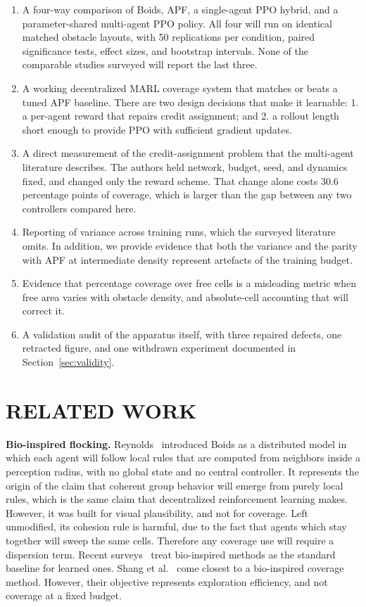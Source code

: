 \documentclass[a4paper, 10pt, conference]{ieeeconf}
\begin{document}
\begin{enumerate}
    \item A four-way comparison of Boids, APF, a single-agent PPO
    hybrid, and a parameter-shared multi-agent PPO policy. All four
    will run on identical matched obstacle layouts, with 50
    replications per condition, paired significance tests, effect
    sizes, and bootstrap intervals. None of the comparable studies
    surveyed will report the last three.
    \item A working decentralized MARL coverage system that matches or
    beats a tuned APF baseline. There are two design decisions that
    make it learnable: 1. a per-agent reward that repairs credit
    assignment; and 2. a rollout length short enough to provide PPO
    with sufficient gradient updates.
    \item A direct measurement of the credit-assignment problem that
    the multi-agent literature describes. The authors held network,
    budget, seed, and dynamics fixed, and changed only the reward
    scheme. That change alone costs 30.6 percentage points of
    coverage, which is larger than the gap between any two
    controllers compared here.
    \item Reporting of variance across training runs, which the
    surveyed literature omits. In addition, we provide evidence that
    both the variance and the parity with APF at intermediate density
    represent artefacts of the training budget.
    \item Evidence that percentage coverage over free cells is a
    misleading metric when free area varies with obstacle density, and
    absolute-cell accounting that will correct it.
    \item A validation audit of the apparatus itself, with three
    repaired defects, one retracted figure, and one withdrawn
    experiment documented in Section~\ref{sec:validity}.
\end{enumerate}

\section{RELATED WORK}\label{sec:related}

\textbf{Bio-inspired flocking.} Reynolds~\cite{reynolds1987}
introduced Boids as a distributed model in which each agent will
follow local rules that are computed from neighbors inside a
perception radius, with no global state and no central controller. It
represents the origin of the claim that coherent group behavior will
emerge from purely local rules, which is the same claim that
decentralized reinforcement learning makes. However, it was built for
visual plausibility, and not for coverage. Left unmodified, its
cohesion rule is harmful, due to the fact that agents which stay
together will sweep the same cells. Therefore any coverage use will
require a dispersion term. Recent
surveys~\cite{xu2022,alqudsi2024,arshid2025} treat bio-inspired
methods as the standard baseline for learned ones. Shang et
al.~\cite{shang2025} come closest to a bio-inspired coverage method.
However, their objective represents exploration efficiency, and not
coverage at a fixed budget.
\end{document}
